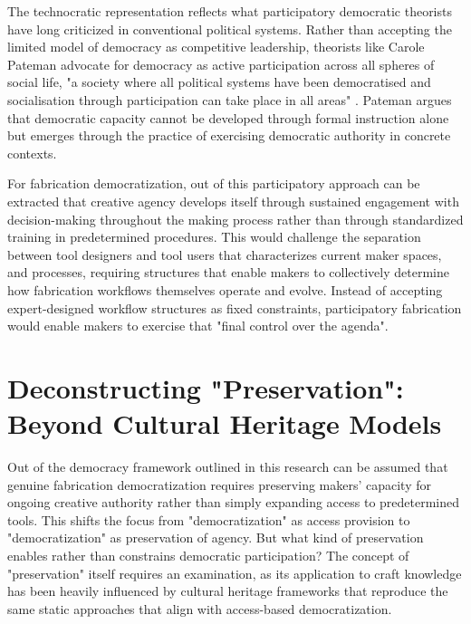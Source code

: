 The technocratic representation reflects what participatory democratic theorists have long criticized in conventional political systems. Rather than accepting the limited model of democracy as competitive leadership, theorists like Carole Pateman advocate for democracy as active participation across all spheres of social life, "a society where all political systems have been democratised and socialisation through participation can take place in all areas" \citep{pateman1976}. Pateman argues that democratic capacity cannot be developed through formal instruction alone but emerges through the practice of exercising democratic authority in concrete contexts.

\vspace{0.5cm}

For fabrication democratization, out of this participatory approach can be extracted that creative agency develops itself through sustained engagement with decision-making throughout the making process rather than through standardized training in predetermined procedures. This would challenge the separation between tool designers and tool users that characterizes current maker spaces, and processes, requiring structures that enable makers to collectively determine how fabrication workflows themselves operate and evolve. Instead of accepting expert-designed workflow structures as fixed constraints, participatory fabrication would enable makers to exercise that "final control over the agenda".

\section{Deconstructing "Preservation": Beyond Cultural Heritage Models}

Out of the democracy framework outlined in this research can be assumed that genuine fabrication democratization requires preserving makers' capacity for ongoing creative authority rather than simply expanding access to predetermined tools. This shifts the focus from "democratization" as access provision to "democratization" as preservation of agency. But what kind of preservation enables rather than constrains democratic participation? The concept of "preservation" itself requires an examination, as its application to craft knowledge has been heavily influenced by cultural heritage frameworks that reproduce the same static approaches that align with access-based democratization.

\vspace{0.5cm}


